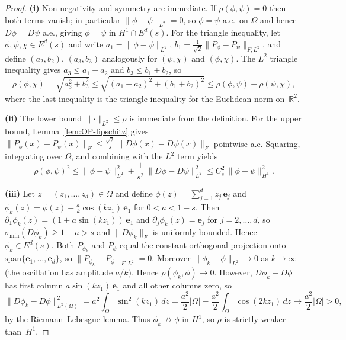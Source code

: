 \documentclass[10pt,a4paper]{amsart}
\newcommand{\Om}{\Omega}
\newcommand{\R}{\mathbb{R}}
\newcommand{\abs}[1]{|#1|}
\newcommand{\norm}[1]{\lVert#1\rVert}
\newcommand{\sigmin}{\sigma_{\min}}
\begin{document}
\begin{proof}
  \textbf{(i)}
  Non-negativity and symmetry are immediate.
  If $\rho(\phi,\psi)=0$ then both terms vanish; in particular
  $\norm{\phi-\psi}_{L^2}=0$, so $\phi=\psi$ a.e.\ on $\Om$ and hence
  $D\phi = D\psi$ a.e., giving $\phi=\psi$ in $H^1\cap E^d(s)$.
  For the triangle inequality, let $\phi,\psi,\chi\in E^d(s)$ and
  write $a_1=\norm{\phi-\psi}_{L^2}$,
  $b_1=\tfrac{1}{\sqrt{2}}\norm{P_\phi-P_\psi}_{F,L^2}$,
  and define $(a_2,b_2)$, $(a_3,b_3)$ analogously for
  $(\psi,\chi)$ and $(\phi,\chi)$.
  The $L^2$ triangle inequality gives $a_3\le a_1+a_2$ and
  $b_3\le b_1+b_2$, so $$\rho(\phi,\chi)
    = \sqrt{a_3^2+b_3^2}
    \le \sqrt{(a_1{+}a_2)^2+(b_1{+}b_2)^2}
    \le \rho(\phi,\psi)+\rho(\psi,\chi),$$
  where the last inequality is the triangle inequality for the
  Euclidean norm on~$\R^2$.

\smallskip
  \noindent\textbf{(ii)}
  The lower bound $\norm{\cdot}_{L^2}\le\rho$ is immediate from the
  definition.
  For the upper bound, Lemma~\ref{lem:OP-lipschitz} gives
  $\norm{P_\phi(x)-P_\psi(x)}_F \le \frac{\sqrt{2}}{s}\,
  \norm{D\phi(x)-D\psi(x)}_F$
  pointwise a.e.
  Squaring, integrating over $\Om$, and combining with the $L^2$ term
  yields
   $$ \rho(\phi,\psi)^2
    \le \norm{\phi-\psi}_{L^2}^2
     + \frac{1}{s^2}\,\norm{D\phi-D\psi}_{L^2}^2
    \le C_s^2\,\norm{\phi-\psi}_{H^1}^2.$$

\smallskip
	  \noindent\textbf{(iii)}
	Let $z=(z_1,\dots,z_d)\in \Om$ and define
	  $\phi(z)=\sum_{j=1}^d z_j\,\bm e_j $ and
	 $\phi_k(z)=\phi(z)-\frac{a}{k}\cos(k z_1)\,\bm e_1$
	  for $0<a<1-s$.
	  Then
	  $\partial_1\phi_k(z)=(1+a\sin(k z_1))\,\bm e_1$ and
	  $\partial_j\phi_k(z)=\bm e_j$ for $j=2,\dots,d$, so
	  $\sigmin(D\phi_k)\ge 1-a>s$ and $\norm{D\phi_k}_F$ is uniformly
	  bounded.  Hence $\phi_k\in E^d(s)$.
	  Both $P_{\phi_k}$ and $P_\phi$ equal the constant orthogonal
	  projection onto $\mathrm{span}\{\bm e_1,\dots,\bm e_d\}$, so
	  $\norm{P_{\phi_k}-P_\phi}_{F,L^2}=0$.
	  Moreover $\norm{\phi_k-\phi}_{L^2}\to 0$ as $k\to\infty$
	  (the oscillation has amplitude $a/k$).
	  Hence $\rho(\phi_k,\phi)\to 0$.
	  However,
	  $D\phi_k - D\phi$ has first column $a\sin(k z_1)\,\bm e_1$ and all
	  other columns zero, so
	   $$ \norm{D\phi_k-D\phi}_{L^2(\Om)}^2
	    = a^2\int_\Om \sin^2(k z_1)\,dz
	    = \frac{a^2}{2}\abs{\Om}
	      -\frac{a^2}{2}\int_\Om \cos(2k z_1)\,dz
	    \rightarrow \frac{a^2}{2}\abs{\Om}>0,$$
	  by the Riemann--Lebesgue lemma.
	  Thus $\phi_k\not\to\phi$ in $H^1$, so $\rho$ is strictly weaker
	  than~$H^1$.
	\end{proof}
\end{document}
